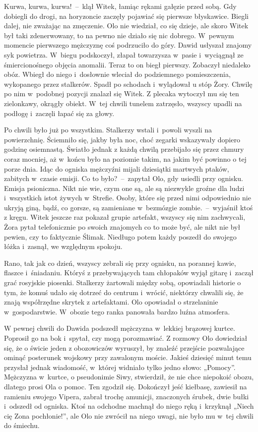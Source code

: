 \documentclass[../MAIN.tex]{subfiles}
\begin{document}
\sd
\xx Kurwa, kurwa, kurwa!~--~klął Witek, łamiąc rękami gałęzie przed sobą.
\qm
Gdy dobiegli do drogi, na horyzoncie zaczęły pojawiać się pierwsze błyskawice. Biegli dalej, nie zważając na zmęczenie. Olo nie wiedział, co się dzieje, ale skoro Witek był taki zdenerwowany, to na pewno nie działo się nic dobrego. W~pewnym momencie pierwszego mężczyznę coś podrzuciło do góry. Dawid usłyszał znajomy syk powietrza. W~biegu podskoczył, złapał towarzysza w~pasie i~wyciągnął ze śmiercionośnego objęcia anomalii. Teraz to on biegł pierwszy. Zobaczył niedaleko obóz. Wbiegł do niego i~dosłownie wleciał do podziemnego pomieszczenia, wykopanego przez stalkerów. Spadł po schodach i~wylądował u stóp Żory. Chwilę po nim w~podobnej pozycji znalazł się Witek. Z plecaka wytoczył mu się ten zielonkawy, okrągły obiekt. W~tej chwili tunelem zatrzęsło, wszyscy upadli na podłogę i~zaczęli łapać się za głowy.

Po chwili było już po wszystkim. Stalkerzy wstali i~powoli wyszli na powierzchnię. Ściemniło się, jakby była noc, choć zegarki wskazywały dopiero godzinę osiemnastą. Światło jednak z każdą chwilą przebijało się przez chmury coraz mocniej, aż w~końcu było na poziomie takim, na jakim być powinno o tej porze dnia. Idąc do ogniska mężczyźni mijali dziesiątki martwych ptaków, zabitych w~czasie emisji.
\sd
\xx Co to było?~--~zapytał Olo, gdy usiedli przy ognisku.
\xx Emisja psioniczna. Nikt nie wie, czym one są, ale są niezwykle groźne dla ludzi i~wszystkich istot żywych w~Strefie. Osoby, które się przed nimi odpowiednio nie ukryją giną, bądź, co gorsze, są zamieniane w~bezmózgie zombie.~--~wyjaśnił ktoś z kręgu.
\qm
Witek jeszcze raz pokazał grupie artefakt, wszyscy się nim zachwycali, Żora pytał telefonicznie po swoich znajomych co to może być, ale nikt nie był pewien, czy to faktycznie Ślimak. Niedługo potem każdy poszedł do swojego łóżka i~zasnął, we względnym spokoju.

Rano, tak jak co dzień, wszyscy zebrali się przy ognisku, na porannej kawie, flaszce i~śniadaniu. Któryś z przebywających tam chłopaków wyjął gitarę i~zaczął grać rosyjskie piosenki. Stalkerzy żartowali między sobą, opowiadali historie o tym, że komuś udało się dotrzeć do centrum i~wrócić, niektórzy chwalili się, że znają współrzędne skrytek z artefaktami. Olo opowiadał o strzelaninie w~gospodarstwie. W~obozie tego ranka panowała bardzo luźna atmosfera.

W pewnej chwili do Dawida podszedł mężczyzna w~lekkiej brązowej kurtce. Poprosił go na bok i~spytał, czy mogą porozmawiać. Z rozmowy Olo dowiedział się, że o świcie jeden z obozowiczów wyruszył, by znaleźć przejście pozwalające ominąć posterunek wojskowy przy zawalonym moście. Jakieś dziesięć minut temu przysłał jednak wiadomość, w~której widniało tylko jedno słowo: „Pomocy”. Mężczyzna w~kurtce, o pseudonimie Siwy, stwierdził, że nie chce niepokoić obozu, dlatego prosi Ola o pomoc. Ten zgodził się. Dokończył jeść kiełbasę, zawiesił na ramieniu swojego Vipera, zabrał trochę amunicji, znaczonych śrubek, dwie bułki i~odszedł od ogniska. Ktoś na odchodne machnął do niego ręką i~krzyknął „Niech cię Zona pochłonie!”, ale Olo nie zwrócił na niego uwagi, nie było mu w~tej chwili do śmiechu.
\end{document}

